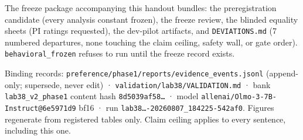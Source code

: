 \documentclass[10pt]{article}
\begin{document}
The freeze package accompanying this handout bundles: the preregistration
candidate (every analysis constant frozen), the freeze review, the
blinded equality sheets (PI ratings requested), the dev-pilot artifacts,
and \texttt{DEVIATIONS.md} (7 numbered departures, none touching the
claim ceiling, safety wall, or gate order). \texttt{behavioral\_frozen}
refuses to run until the freeze record exists.

\vfill
\textcolor{muted}{\footnotesize Binding records:
\texttt{preference/phase1/reports/evidence\_events.jsonl} (append-only;
supersede, never edit) ·
\texttt{validation/lab38/VALIDATION.md} ·
bank \texttt{lab38\_v2\_phase1} content hash \texttt{8d5039af58\ldots} ·
model \texttt{allenai/Olmo-3-7B-Instruct@6e5971d9} bf16 ·
run \texttt{lab38\ldots-20260807\_184225-542af0}. Figures regenerate from
registered tables only. Claim ceiling applies to every sentence,
including this one.}
\end{document}
